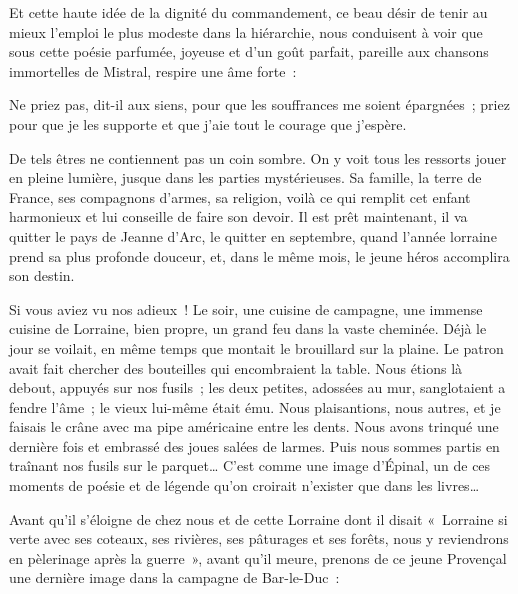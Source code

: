 \documentclass[french,twoside]{book} %
\newenvironment{quoteblock}%
  {\begin{quoting}}
  {\end{quoting}}
\newenvironment{quotebar}{%
    \def\FrameCommand{{\color{rubric!10!}\vrule width 0.5em} \hspace{0.9em}}%
    \def\OuterFrameSep{\itemsep} %
    \MakeFramed {\advance\hsize-\width \FrameRestore}
  }%
  {%
    \endMakeFramed
  }
\renewenvironment{quoteblock}%
  {%
    \savenotes
    \setstretch{0.9}
    \normalfont
    \begin{quotebar}
  }
  {%
    \end{quotebar}
    \spewnotes
  }
\begin{document}
\noindent Et cette haute idée de la dignité du commandement, ce beau désir de tenir au mieux l’emploi le plus modeste dans la hiérarchie, nous conduisent à voir que sous cette poésie parfumée, joyeuse et d’un goût parfait, pareille aux chansons immortelles de Mistral, respire une âme forte :‌\par

\begin{quoteblock}
 \noindent Ne priez pas, dit-il aux siens, pour que les souffrances me soient épargnées ; priez pour que je les supporte et que j’aie tout le courage que j’espère.‌
 \end{quoteblock}

\noindent De tels êtres ne contiennent pas un coin sombre. On y voit tous les ressorts jouer en pleine lumière, jusque dans les parties mystérieuses. Sa famille, la terre de France, ses compagnons d’armes, sa religion, voilà ce qui remplit cet enfant harmonieux et lui conseille de faire son devoir. Il est prêt maintenant, il va quitter le pays de Jeanne d’Arc, le quitter en septembre, quand l’année lorraine prend sa plus profonde douceur, et, dans le même mois, le jeune héros accomplira son destin.‌\par

\begin{quoteblock}
 \noindent Si vous aviez vu nos adieux ! Le soir, une cuisine de campagne, une immense cuisine de Lorraine, bien propre, un grand feu dans la vaste cheminée. Déjà le jour se voilait, en même temps que montait le brouillard sur la plaine. Le patron avait fait chercher des bouteilles qui encombraient la table. Nous étions là debout, appuyés sur nos fusils ; les deux petites, adossées au mur, sanglotaient a fendre l’âme ; le vieux lui-même était ému. Nous plaisantions, nous autres, et je faisais le crâne avec ma pipe américaine entre les dents. Nous avons trinqué une dernière fois et embrassé des joues salées de larmes. Puis nous sommes partis en traînant nos fusils sur le parquet… C’est comme une image d’Épinal, un de ces moments de poésie et de légende qu’on croirait n’exister que dans les livres…‌
 \end{quoteblock}

\noindent Avant qu’il s’éloigne de chez nous et de cette Lorraine dont il disait « Lorraine si verte avec ses coteaux, ses rivières, ses pâturages et ses forêts, nous y reviendrons en pèlerinage après la guerre », avant qu’il meure, prenons de ce jeune Provençal une dernière image dans la campagne de Bar-le-Duc :‌\par
\end{document}

